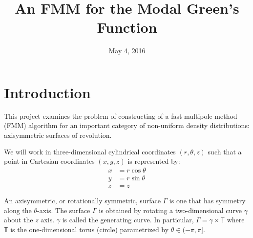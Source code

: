 \documentclass[11pt, oneside]{article}   	%
\title{An FMM for the Modal Green's Function}
\date{May 4, 2016}
\begin{document}
\maketitle

\section{Introduction}
This project examines the problem of constructing of a fast multipole method (FMM) algorithm for an important category of non-uniform density distributions: axisymmetric surfaces of revolution.

We will work in three-dimensional cylindrical coordinates $(r,\theta,z)$ such that a point in Cartesian coordinates $(x,y,z)$ is represented by:
\begin{align*}
x &= r\cos\theta\\
y &= r\sin\theta\\
z &= z
\end{align*}

An axisymmetric, or rotationally symmetric, surface $\Gamma$ is one that has symmetry along the $\theta$-axis. The surface $\Gamma$ is obtained by rotating a two-dimensional curve $\gamma$ about the $z$ axis. $\gamma$ is called the generating curve. In particular, $\Gamma=\gamma\times\mathbb{T}$ where $\mathbb{T}$ is the one-dimensional torus (circle) parametrized by $\theta\in(-\pi,\pi]$.
\end{document}
